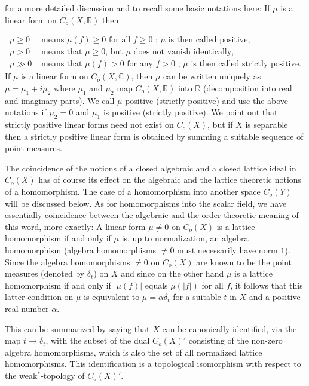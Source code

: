 
for a more detailed discussion and to recall some basic notations here: If $\mu$ is a linear form on $C_{o}(X,\mathbb{R})$ then

\[
\begin{aligned}
	\mu \geq 0 &\text{ means } \mu(f) \geq 0 \text{ for all } f \geq 0 \text{ ; } \mu \text{ is then called positive}, \\
	\mu > 0 &\text{ means that } \mu \geq 0 \text{, but } \mu \text{ does not vanish identically}, \\
	\mu \gg 0 &\text{ means that } \mu(f) > 0 \text{ for any } f > 0 \text{ ; } \mu \text{ is then called strictly positive}.
\end{aligned}
\]
If $\mu$ is a linear form on $C_{o}(X,\mathbb{C})$, then $\mu$ can be written uniquely as $\mu = \mu_{1} + i\mu_{2}$ where $\mu_{1}$ and $\mu_{2}$ map $C_{o}(X,\mathbb{R})$ into $\mathbb{R}$ (decomposition into real and imaginary parts).
We call $\mu$ positive (strictly positive) and use the above notations if $\mu_{2} = 0$ and $\mu_{1}$ is positive (strictly positive).
We point out that strictly positive linear forms need not exist on $C_{o}(X)$, but if $X$ is separable then a strictly positive linear form is obtained by summing a suitable sequence of point measures.

The coincidence of the notions of a closed algebraic and a closed lattice ideal in $C_{o}(X)$ has of course its effect on the algebraic and the lattice theoretic notions of a homomorphism.
The case of a homomorphism into another space $C_{o}(Y)$ will be discussed below.
As for homomorphisms into the scalar field, we have essentially coincidence between the algebraic and the order theoretic meaning of this word, more exactly: A linear form $\mu \neq 0$ on $C_{o}(X)$ is a lattice homomorphism if and only if $\mu$ is, up to normalization, an algebra homomorphism (algebra homomorphisms $\neq 0$ must necessarily have norm $1$).
Since the algebra homomorphisms $\neq 0$ on $C_{o}(X)$ are known to be the point measures (denoted by $\delta_{t}$) on $X$ and since on the other hand $\mu$ is a lattice homomorphism if and only if $|\mu(f)|$ equals $\mu(|f|)$ for all $f$, it follows that this latter condition on $\mu$ is equivalent to $\mu = \alpha\delta_{t}$ for a suitable $t$ in $X$ and a positive real number $\alpha$.

This can be summarized by saying that $X$ can be canonically identified, via the map $t \to \delta_{t}$, with the subset of the dual $C_{o}(X)'$ consisting of the non-zero algebra homomorphisms, which is also the set of all normalized lattice homomorphisms.
This identification is a topological isomorphism with respect to the weak$^{*}$-topology of $C_{o}(X)'$.


